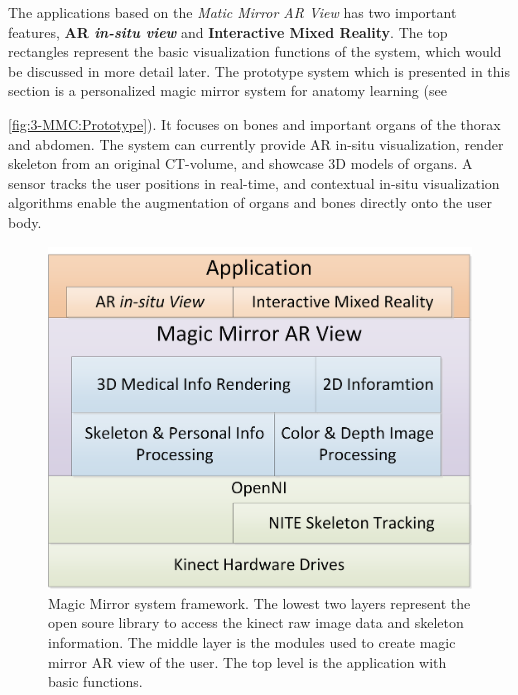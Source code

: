 The applications based on the \textit{Matic Mirror AR View} has two important features, \textbf{AR \textit{in-situ view}} and \textbf{Interactive Mixed Reality}. The top rectangles represent the basic visualization functions of the system, which would be discussed in more detail later. The prototype system which is presented in this section is a personalized magic mirror system for anatomy learning (see \figurename{\ref{fig:3-MMC:Prototype}). It focuses on bones and important organs of the thorax and abdomen. The system can currently provide AR in-situ visualization, render skeleton from an original CT-volume, and showcase 3D models of organs. A sensor tracks the user positions in real-time, and contextual in-situ visualization algorithms enable the augmentation of organs and bones directly onto the user body.
\begin{figure}
	\centering
	\caption[Magic Mirror system framework]{Magic Mirror system framework. The lowest two layers represent the open soure library to access the kinect raw image data and skeleton information. The middle layer is the modules used to create magic mirror AR view of the user. The top level is the application with basic functions.}
	\label{fig:3-MMC:systemFramework}
	\includegraphics[width = 0.7\linewidth]{figures/3-MMC/SystemFramework}
\end{figure}

}
